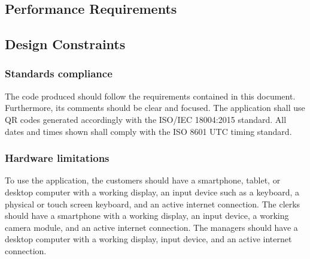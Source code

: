 \subsection{Performance Requirements}


\subsection{Design Constraints}

\subsubsection{Standards compliance}


The code produced should follow the requirements contained in this document.
Furthermore, its comments should be clear and focused.
The application shall use QR codes generated accordingly with the ISO/IEC 18004:2015 standard\cite{isoqrcode}.
All dates and times shown shall comply with the ISO 8601 UTC timing standard\cite{isoutc}.

\subsubsection{Hardware limitations}

To use the application, the customers should have a smartphone, tablet, or desktop computer with a working display, an input device such as a keyboard, a physical or touch screen keyboard, and an active internet connection.
The clerks should have a smartphone with a working display, an input device, a working camera module, and an active internet connection.
The managers should have a desktop computer with a working display, input device, and an active internet connection.

